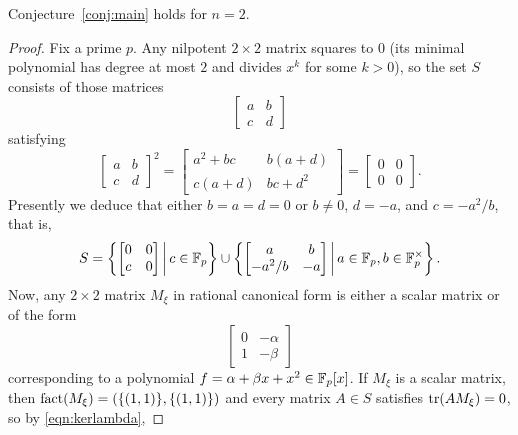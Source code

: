\begin{prop}
\label{prop:2by2case}
Conjecture~\ref{conj:main} holds for $n=2$.
\end{prop}
\begin{proof}
Fix a prime $p$. Any nilpotent $2\times 2$ matrix squares to $0$ (its minimal polynomial has degree at most $2$ and divides $x^k$ for some $k>0$), so the set $S$ consists of those matrices
\begin{equation*}
\begin{bmatrix}
a&b\\
c&d
\end{bmatrix}
\end{equation*}
satisfying
\begin{equation}
\label{eqn:squarezero}
\begin{bmatrix}
a&b\\
c&d
\end{bmatrix}^2
=
\begin{bmatrix}
a^2+bc&b(a+d)\\
c(a+d)&bc+d^2
\end{bmatrix}
=
\begin{bmatrix}
0&0\\
0&0
\end{bmatrix}.
\end{equation}
Presently we deduce that either $b=a=d=0$ or $b\ne 0$, $d=-a$, and $c=-a^2/b$, that is,
\begin{equation}
\label{eqn:nilptwo}
S=\left\{\begin{bmatrix}
0&0\\
c&0
\end{bmatrix} \,\middle|\, c\in\mathbb{F}_p\right\}\cup\left\{\begin{bmatrix}
a&b\\
-a^2/b&-a
\end{bmatrix} \,\middle|\, a\in\mathbb{F}_p,b\in\mathbb{F}_p^\times\right\}.
\end{equation}
Now, any $2\times 2$ matrix $M_\xi$ in rational canonical form is either a scalar matrix or of the form
\begin{equation}
\label{eqn:rcftwo}
\begin{bmatrix}
0&-\alpha\\
1&-\beta
\end{bmatrix}
\end{equation}
corresponding to a polynomial $f=\alpha+\beta x+x^2\in\mathbb{F}_p[x]$. If $M_\xi$ is a scalar matrix, then $\operatorname{fact}(M_\xi)=(\{(1,1)\},\{(1,1)\})$ and every matrix $A\in S$ satisfies $\operatorname{tr}(AM_\xi)=0$, so by \eqref{eqn:kerlambda},

\end{proof}
